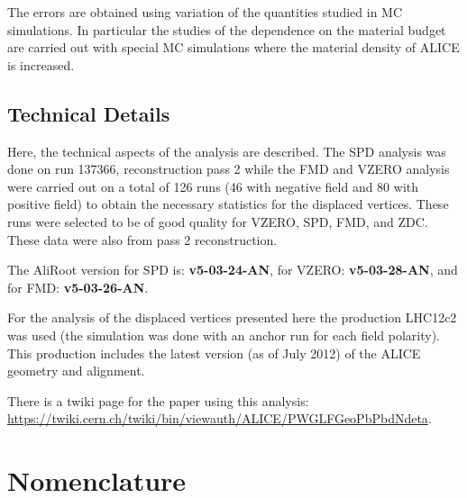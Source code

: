 \documentclass[11pt]{article}
\begin{document}
The errors are obtained using variation of the quantities studied in
MC simulations. In particular the studies of the dependence on the
material budget are carried out with special MC simulations where the
material density of ALICE is increased. 
\subsection{Technical Details}
Here, the technical aspects of the analysis are described. The SPD
analysis was done on run 137366, reconstruction pass 2 while the FMD
and VZERO analysis were carried
out on a total of 126 runs (46 with negative field and 80 with
positive field) to obtain the necessary statistics for the displaced
vertices. These runs were selected to be of good quality for VZERO, SPD, FMD, and
ZDC. These data were also from pass 2 reconstruction.

The AliRoot version for SPD is: \textbf{v5-03-24-AN}, for VZERO: \textbf{v5-03-28-AN}, and
for FMD: \textbf{v5-03-26-AN}. 

For the analysis of the displaced vertices presented here the production LHC12c2 was used (the simulation was done with an anchor run for each field polarity). This production includes the latest version (as of July 2012) of the ALICE geometry and alignment.

There is a twiki page for the paper using this analysis:
\url{https://twiki.cern.ch/twiki/bin/viewauth/ALICE/PWGLFGeoPbPbdNdeta}. 
\clearpage
\appendix 
\section{Nomenclature} 
\label{app:nomen}
\end{document}

